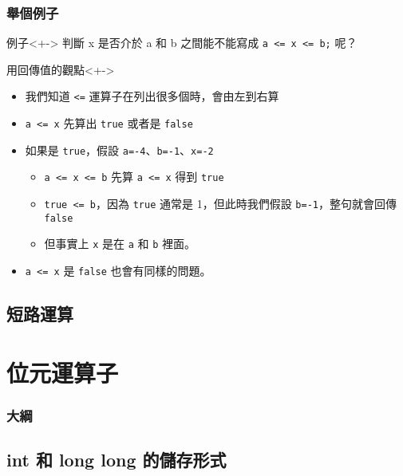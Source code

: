 \documentclass[utf8]{beamer}
\begin{document}
\begin{CJK}{UTF8}{bkai}
\begin{frame}[fragile]
  \frametitle{舉個例子}
  \begin{block}{例子}<+->
  判斷 x 是否介於 a 和 b 之間能不能寫成 \lstinline{a <= x <= b;} 呢？
  \end{block}
  \begin{exampleblock}{用回傳值的觀點}<+->
    \begin{itemize}
    \item 我們知道 \lstinline{<=} 運算子在列出很多個時，會\alert{由左到右算}
    \item<+-> \alert{\lstinline{a <= x}} 先算出 \lstinline{true} 或者是 \lstinline{false}
    \item<+-> 如果是 \lstinline{true}，假設 \lstinline{a=-4}、\lstinline{b=-1}、\lstinline{x=-2}
      \begin{itemize}[<+->]
      \item \lstinline{a <= x <= b} 先算 \lstinline{a <= x} 得到 \lstinline{true}
      \item \lstinline{true <= b}，因為 \lstinline{true} 通常是 1，但此時我們假設 \lstinline{b=-1}，整句就會回傳 \lstinline{false}
      \item 但事實上 \lstinline{x} 是在 \lstinline{a} 和 \lstinline{b} 裡面。
      \end{itemize}
    \item<+-> \lstinline{a <= x} 是 \lstinline{false} 也會有同樣的問題。
    \end{itemize}
  \end{exampleblock}
\end{frame}

\subsection{短路運算}

\section{位元運算子}
\begin{frame}
  \frametitle{大綱}
  \begin{multicols}{2}
    \tableofcontents[currentsection]
  \end{multicols}
\end{frame}

\subsection{int 和 long long 的儲存形式}


\end{CJK}
\end{document}
